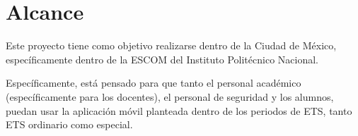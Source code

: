 \section{Alcance}
Este proyecto tiene como objetivo realizarse dentro de la Ciudad de México, específicamente dentro de la ESCOM del Instituto Politécnico Nacional. 

Específicamente, está pensado para que tanto el personal académico (específicamente para los docentes), el personal de seguridad y los alumnos, puedan usar la aplicación móvil planteada dentro de los periodos de ETS, tanto ETS ordinario como especial.